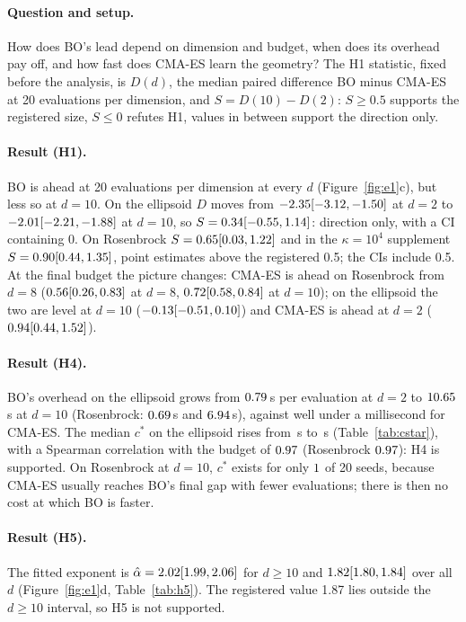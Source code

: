 \documentclass[10pt,a4paper,twocolumn]{article}
\begin{document}
\paragraph{Question and setup.}
How does BO's lead depend on dimension and budget, when does its overhead pay off, and how fast does CMA-ES learn the
geometry? The H1 statistic, fixed before the analysis, is $D(d)$, the median paired difference BO minus CMA-ES at 20
evaluations per dimension, and $S=D(10)-D(2)$: $S\geq0.5$ supports the registered size, $S\leq0$ refutes H1, values in
between support the direction only.

\paragraph{Result (H1).}
BO is ahead at 20 evaluations per dimension at every $d$ (Figure~\ref{fig:e1}c), but less so at $d=10$. On the ellipsoid
$D$ moves from $-2.35 [-3.12, -1.50]$ at $d=2$ to $-2.01 [-2.21, -1.88]$ at $d=10$, so $S=0.34 [-0.55, 1.14]$: direction
only, with a CI containing 0. On Rosenbrock $S=0.65 [0.03, 1.22]$ and in the $\kappa=10^4$ supplement $S=0.90 [0.44, 1.35]$,
point estimates above the registered 0.5; the CIs include 0.5. At the final budget the picture changes: CMA-ES is ahead on Rosenbrock from $d=8$
($0.56 [0.26, 0.83]$ at $d=8$, $0.72 [0.58, 0.84]$ at $d=10$); on the ellipsoid the two are level at
$d=10$ ($-0.13 [-0.51, 0.10]$) and CMA-ES is ahead at $d=2$ ($0.94 [0.44, 1.52]$).

\paragraph{Result (H4).}
BO's overhead on the ellipsoid grows from $0.79$\,s per evaluation at $d=2$ to
$10.65$\,s at $d=10$ (Rosenbrock: $0.69$\,s and
$6.94$\,s), against well under a millisecond for CMA-ES. The median $c^*$ on the ellipsoid rises
from \numcstarellipsoidtwo\,s to \numcstarellipsoidten\,s (Table~\ref{tab:cstar}), with a Spearman correlation with the
budget of $0.97$ (Rosenbrock $0.97$): H4 is supported. On Rosenbrock at
$d=10$, $c^*$ exists for only $1$ of 20 seeds, because CMA-ES usually reaches BO's final gap
with fewer evaluations; there is then no cost at which BO is faster.

\paragraph{Result (H5).}
The fitted exponent is $\hat\alpha=2.02 [1.99, 2.06]$ for $d\geq10$ and $1.82 [1.80, 1.84]$ over all $d$ (Figure~\ref{fig:e1}d,
Table~\ref{tab:h5}). The registered value 1.87 lies outside the $d\geq10$ interval, so H5 is not supported.
\end{document}
